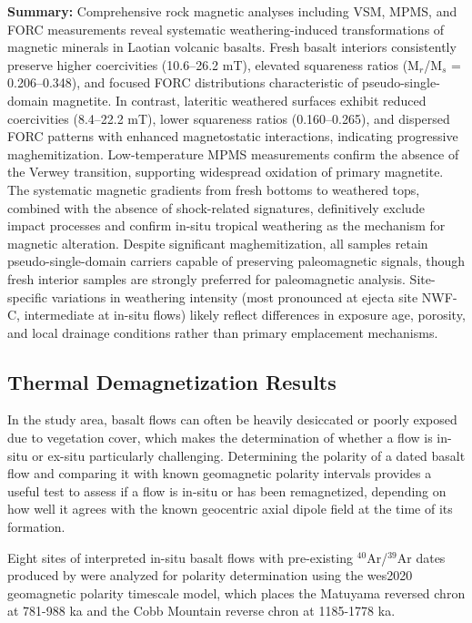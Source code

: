 \documentclass[twocolumn,11pt]{article}
\begin{document}
\textbf{Summary:} Comprehensive rock magnetic analyses including VSM, MPMS, and FORC measurements reveal systematic weathering-induced transformations of magnetic minerals in Laotian volcanic basalts. Fresh basalt interiors consistently preserve higher coercivities (10.6--26.2 mT), elevated squareness ratios (M$_r$/M$_s$ = 0.206--0.348), and focused FORC distributions characteristic of pseudo-single-domain magnetite. In contrast, lateritic weathered surfaces exhibit reduced coercivities (8.4--22.2 mT), lower squareness ratios (0.160--0.265), and dispersed FORC patterns with enhanced magnetostatic interactions, indicating progressive maghemitization. Low-temperature MPMS measurements confirm the absence of the Verwey transition, supporting widespread oxidation of primary magnetite. The systematic magnetic gradients from fresh bottoms to weathered tops, combined with the absence of shock-related signatures, definitively exclude impact processes and confirm in-situ tropical weathering as the mechanism for magnetic alteration. Despite significant maghemitization, all samples retain pseudo-single-domain carriers capable of preserving paleomagnetic signals, though fresh interior samples are strongly preferred for paleomagnetic analysis. Site-specific variations in weathering intensity (most pronounced at ejecta site NWF-C, intermediate at in-situ flows) likely reflect differences in exposure age, porosity, and local drainage conditions rather than primary emplacement mechanisms.

\subsection{Thermal Demagnetization Results}

In the study area, basalt flows can often be heavily desiccated or poorly exposed due to vegetation cover, which makes the determination of whether a flow is in-situ or ex-situ particularly challenging. Determining the polarity of a dated basalt flow and comparing it with known geomagnetic polarity intervals provides a useful test to assess if a flow is in-situ or has been remagnetized, depending on how well it agrees with the known geocentric axial dipole field at the time of its formation.

Eight sites of interpreted in-situ basalt flows with pre-existing $^{40}$Ar/$^{39}$Ar dates produced by \citet{Sieh2019} were analyzed for polarity determination using the wes2020 geomagnetic polarity timescale model, which places the Matuyama reversed chron at 781-988 ka and the Cobb Mountain reverse chron at 1185-1778 ka.
\end{document}

